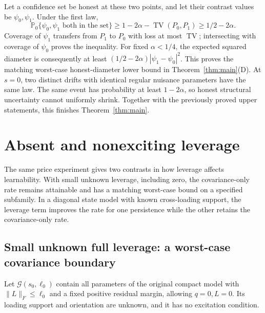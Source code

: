 \documentclass[11pt,a4paper]{amsart}
\theoremstyle{plain}
\theoremstyle{definition}
\theoremstyle{remark}
\newcommand{\PP}{\mathbb{P}}
\DeclareMathOperator{\TV}{TV}
\begin{document}
Let a confidence set be honest at these two points, and let their contrast
values be $\psi_0,\psi_1$. Under the first law,
\begin{equation}\label{eq:two-point-diameter}
 \PP_0\{\psi_0,\psi_1\text{ both in the set}\}
 \ge1-2\alpha-\TV(P_0,P_1)\ge1/2-2\alpha.
\end{equation}
Coverage of $\psi_1$ transfers from $P_1$ to $P_0$ with loss at most
$\TV$; intersecting with coverage of $\psi_0$ proves the inequality.
For fixed $\alpha<1/4$, the expected squared diameter is consequently
at least $(1/2-2\alpha)|\psi_1-\psi_0|^2$. This proves the matching
worst-case honest-diameter lower bound in Theorem~\ref{thm:main}(D).
At $s=0$, two distinct drifts with identical regular nuisance parameters have
the same law. The same event has probability at least $1-2\alpha$,
so honest structural uncertainty cannot uniformly shrink. Together with
the previously proved upper statements, this finishes
Theorem~\ref{thm:main}.

\section{Absent and nonexciting leverage}\label{sec:contrasts}

The same price experiment gives two contrasts in how leverage affects
learnability. With small unknown leverage, including zero, the
covariance-only rate remains attainable and has a matching worst-case bound
on a specified subfamily. In a diagonal state model with known
cross-loading support, the leverage term improves the rate for one
persistence while the other retains the covariance-only rate.

\subsection{Small unknown full leverage: a worst-case covariance boundary}

Let $\mathcal G(s_0,\ell_0)$ contain all parameters of the original compact
model with $\|L\|_F\le\ell_0$ and a fixed positive residual margin, allowing
$q=0,L=0$. Its loading support and orientation are unknown, and it has no
excitation condition.
\end{document}

